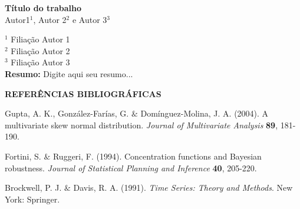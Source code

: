\documentclass[12pt, a4paper]{article}
\begin{document}
%
\begin{center}
\textbf{Título do trabalho}\\[2em]
Autor1$^1$, Autor 2$^2$ e Autor 3$^3$\\[1em]
\end{center}
$^1$ Filiação Autor 1\\
$^2$ Filiação Autor 2\\
$^3$ Filiação Autor 3\\



\noindent \textbf{Resumo:} Digite aqui seu resumo... 

\vspace{0.5cm} \noindent \textbf{REFERÊNCIAS BIBLIOGRÁFICAS}


\begin{description}

{\item[]Gupta, A. K., González-Farías, G. $\&$ Domínguez-Molina, J. A. (2004).
A multivariate skew normal distribution. {\it
Journal of Multivariate Analysis} {\bf 89}, 181-190.}

{\item[]Fortini, S. $\&$ Ruggeri, F. (1994). Concentration functions and Bayesian robustness. {\it Journal of Statistical Planning and Inference}
{\bf 40}, 205-220.}

{\item[]Brockwell, P. J. $\&$ Davis, R. A. (1991). {\it Time Series: Theory and Methods}. 
New York: Springer.}

\end{description}
\end{document}
